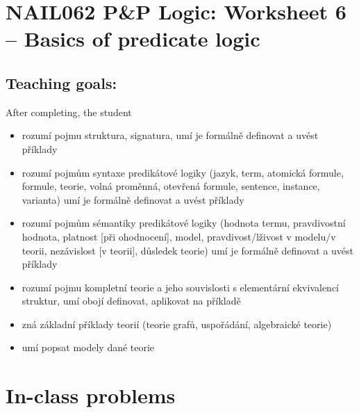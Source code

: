 \section*{NAIL062 P\&P Logic: Worksheet 6 -- Basics of predicate logic}


\subsection*{Teaching goals:} After completing, the student

\begin{itemize}\setlength{\itemsep}{0pt}
    \item rozumí pojmu struktura, signatura, umí je formálně definovat a uvést příklady
    \item rozumí pojmům syntaxe predikátové logiky (jazyk, term, atomická formule, formule, teorie, volná proměnná, otevřená formule, sentence, instance, varianta) umí je formálně definovat a uvést příklady
    \item rozumí pojmům sémantiky predikátové logiky (hodnota termu, pravdivostní hodnota, platnost [při ohodnocení], model, pravdivost/lživost v modelu/v teorii, nezávislost [v teorii], důsledek teorie) umí je formálně definovat a uvést příklady
    \item rozumí pojmu kompletní teorie a jeho souvislosti s elementární ekvivalencí struktur, umí obojí definovat, aplikovat na příkladě
    \item zná základní příklady teorií (teorie grafů, uspořádání, algebraické teorie)
    \item umí popsat modely dané teorie    
\end{itemize}
    

\section*{In-class problems}


